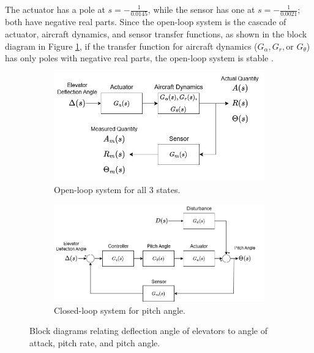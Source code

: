 \documentclass[9pt,a4paper]{article}
\begin{document}
    \noindent The actuator has a pole at $s = -\frac{1}{0.0145}$, while the sensor has one at $s=-\frac{1}{0.0021}$; both have negative real parts. Since the open-loop system is the cascade of actuator, aircraft dynamics, and sensor transfer functions, as shown in the block diagram in Figure \ref{fig:ol_blockDiagram}, if the transfer function for aircraft dynamics ($G_{\alpha}, G_{r}, \text{or } G_{\theta}$) has only poles with negative real parts, the open-loop system is stable \cite[Theorem 9.9]{textbook}.
    \begin{figure}[h]
        \begin{subfigure}[h]{0.5\textwidth}
            \centering
            \includegraphics[width = \textwidth]{figs/ELE2038_H5_openLoopBlockDiagram.drawio.jpg}
            \caption{Open-loop system for all 3 states.}
            \label{fig:ol_blockDiagram}            
        \end{subfigure}%
        \begin{subfigure}[h]{0.5\textwidth}
            \centering
            \includegraphics[width = \textwidth]{figs/ELE2038_H5_closedLoopBlockDiagram.drawio.jpg}
            \caption{Closed-loop system for pitch angle.}
            \label{fig:cl_blockDiagram}
        \end{subfigure}
    \caption{Block diagrams relating deflection angle of elevators to angle of attack, pitch rate, and pitch angle.}
    \end{figure}
    
\end{document}
